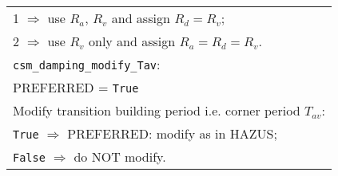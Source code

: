 \begin{tabular}{|p{\textwidth}|}
 \hspace{0.5em} 1 $\Rightarrow$ use $R_a$, $R_v$ and assign $R_d= R_v$; \\
 \hspace{0.5em} 2 $\Rightarrow$ use $R_v$ only and assign $R_a=R_d=R_v$. \\
\hline \vspace{0.1em} \texttt{csm\_damping\_modify\_Tav}: \\
PREFERRED = \texttt{True} \\
Modify transition building period i.e. corner period $T_{av}$: \\
 \hspace{0.5em} \texttt{True} $\Rightarrow$ \small{PREFERRED}: modify as in HAZUS; \\
 \hspace{0.5em}  \texttt{False} $\Rightarrow$ do NOT modify. \\
 \hline
\end{tabular}




